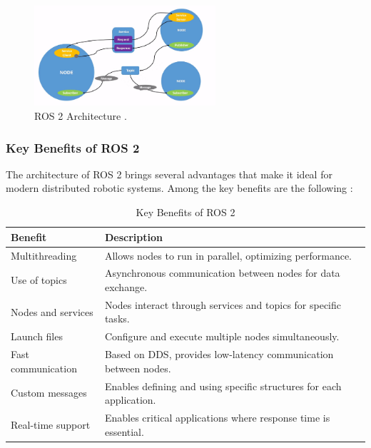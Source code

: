     \begin{figure}[h!]
        \centering
        \includegraphics[width=0.6\textwidth]{pictures/ros2_arch.png}
        \caption{ROS 2 Architecture \cite{ros_docs}.}
        \label{fig:ros2_architecture}
    \end{figure}
    
    \subsubsection{Key Benefits of ROS 2}
    
    The architecture of ROS 2 brings several advantages that make it ideal for modern distributed robotic systems. Among the key benefits are the following \cite{ros_docs}:  
    
    \begin{table}[h!]
    \centering
    \caption{Key Benefits of ROS 2}
    \begin{tabular}{|l|p{10cm}|}
    \hline
    \textbf{Benefit} & \textbf{Description} \\
    \hline
    Multithreading & Allows nodes to run in parallel, optimizing performance. \\
    \hline
    Use of topics & Asynchronous communication between nodes for data exchange. \\
    \hline
    Nodes and services & Nodes interact through services and topics for specific tasks. \\
    \hline
    Launch files & Configure and execute multiple nodes simultaneously. \\
    \hline
    Fast communication & Based on DDS, provides low-latency communication between nodes. \\
    \hline
    Custom messages & Enables defining and using specific structures for each application. \\
    \hline
    Real-time support & Enables critical applications where response time is essential. \\
    \hline
    \end{tabular}
    \label{table:benefits}
    \end{table}    

